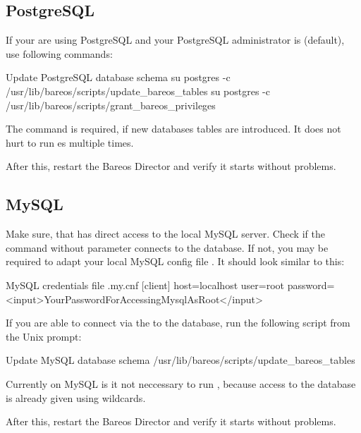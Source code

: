
\subsection{PostgreSQL}
If your are using PostgreSQL and your PostgreSQL administrator is  (default), use following commands:

\begin{commands}{Update PostgreSQL database schema}
su postgres -c /usr/lib/bareos/scripts/update_bareos_tables
su postgres -c /usr/lib/bareos/scripts/grant_bareos_privileges
\end{commands}

The  command is required, if new databases tables are introduced. It does not hurt to run es multiple times.

After this, restart the Bareos Director and verify it starts without problems.

\subsection{MySQL}
Make sure, that  has direct access to the local MySQL server.
Check if the command  without parameter connects to the database.
If not, you may be required to adapt your local MySQL config file .
It should look similar to this:

\begin{config}{MySQL credentials file .my.cnf}
[client]
host=localhost
user=root
password=<input>YourPasswordForAccessingMysqlAsRoot</input>
\end{config}

If you are able to connect via the  to the database, run the following script from the Unix prompt:
\begin{commands}{Update MySQL database schema}
/usr/lib/bareos/scripts/update_bareos_tables
\end{commands}

Currently on MySQL is it not neccessary to run , because access to the database is already given using wildcards.

After this, restart the Bareos Director and verify it starts without problems.
